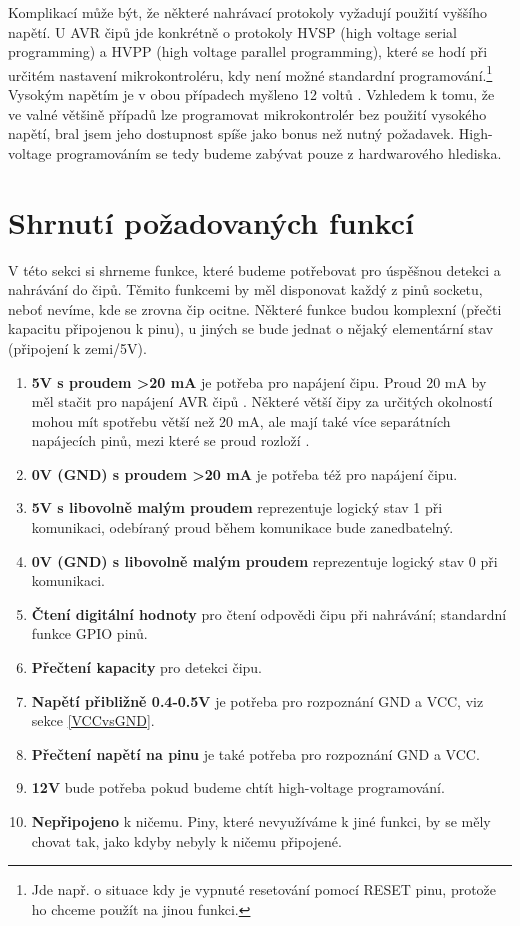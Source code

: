 \documentclass[11pt,a4paper,twoside,openright]{report}
\begin{document}
Komplikací může být, že některé nahrávací protokoly vyžadují použití vyššího napětí. U AVR čipů jde konkrétně o protokoly HVSP (high voltage serial programming) a HVPP (high voltage parallel programming), které se hodí při určitém nastavení mikrokontroléru, kdy není možné standardní programování.\footnote{Jde např. o situace kdy je vypnuté resetování pomocí RESET pinu, protože ho chceme použít na jinou funkci.} Vysokým napětím je v obou případech myšleno 12 voltů \cite{AVRprog}. Vzhledem k tomu, že ve valné většině případů lze programovat mikrokontrolér bez použití vysokého napětí, bral jsem jeho dostupnost spíše jako bonus než nutný požadavek. High-voltage programováním se tedy budeme zabývat pouze z hardwarového hlediska.

\section {Shrnutí požadovaných funkcí\label{pinFunc}}

V této sekci si shrneme funkce, které budeme potřebovat pro úspěšnou detekci a nahrávání do čipů. Těmito funkcemi by měl disponovat každý z pinů socketu, neboť nevíme, kde se zrovna čip ocitne. Některé funkce budou komplexní (přečti kapacitu připojenou k pinu), u jiných se bude jednat o nějaký elementární stav (připojení k zemi/5V). 

\begin{enumerate}
\item \textbf{5V s proudem >20 mA} je potřeba pro napájení čipu. Proud 20 mA by měl stačit pro napájení AVR čipů \cite{attiny85, atmega328}. Některé větší čipy za určitých okolností mohou mít spotřebu větší než 20 mA, ale mají také více separátních napájecích pinů, mezi které se proud rozloží \cite[str.~286-323]{atmega32}.
\item \textbf{0V (GND) s proudem >20 mA} je potřeba též pro napájení čipu. 
\item \textbf{5V s libovolně malým proudem} reprezentuje logický stav 1 při komunikaci, odebíraný proud během komunikace bude zanedbatelný.
\item \textbf{0V (GND) s libovolně malým proudem} reprezentuje logický stav 0 při komunikaci.
\item \textbf{Čtení digitální hodnoty} pro čtení odpovědi čipu při nahrávání; standardní funkce GPIO pinů.
\item \textbf{Přečtení kapacity} pro detekci čipu.
\item \textbf{Napětí přibližně 0.4-0.5V} je potřeba pro rozpoznání GND a VCC, viz sekce \ref{VCCvsGND}.
\item \textbf{Přečtení napětí na pinu} je také potřeba pro rozpoznání GND a VCC.
\item \textbf{12V} bude potřeba pokud budeme chtít high-voltage programování.
\item \textbf{Nepřipojeno} k ničemu. Piny, které nevyužíváme k jiné funkci, by se měly chovat tak, jako kdyby nebyly k ničemu připojené.
\end{enumerate}
\end{document}
